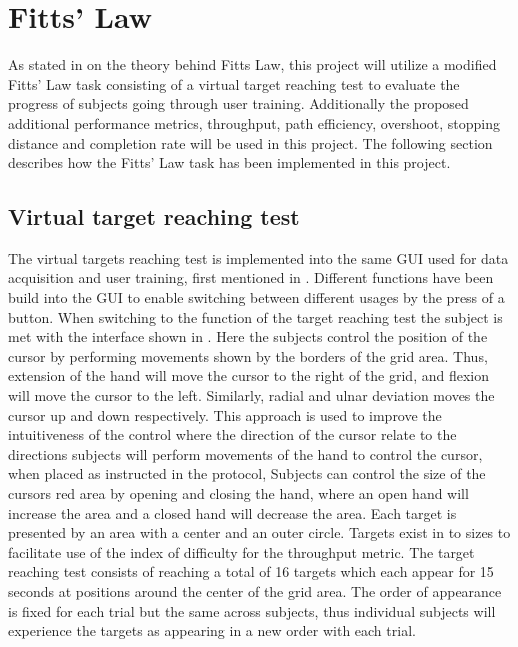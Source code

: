 \section{Fitts' Law} \label{sec:M:fittsLaw}


As stated in  on the theory behind Fitts Law, this project will utilize a modified Fitts' Law task consisting of a virtual target reaching test to evaluate the progress of subjects going through user training. Additionally the proposed additional performance metrics, throughput, path efficiency, overshoot, stopping distance and completion rate will be used in this project. The following section describes how the Fitts' Law task has been implemented in this project.

\subsection{Virtual target reaching test} \label{sub:M:targetReachingTest}

The virtual targets reaching test is implemented into the same GUI used for data acquisition and user training, first mentioned in . Different functions have been build into the GUI to enable switching between different usages by the press of a button. When switching to the function of the target reaching test the subject is met with the interface shown in . Here the subjects control the position of the cursor by performing movements shown by the borders of the grid area. Thus, extension of the hand will move the cursor to the right of the grid, and flexion will move the cursor to the left. Similarly, radial and ulnar deviation moves the cursor up and down respectively. This approach is used to improve the intuitiveness of the control where the direction of the cursor relate to the directions subjects will perform movements of the hand to control the cursor, when placed as instructed in the protocol,  
Subjects can control the size of the cursors red area by opening and closing the hand, where an open hand will increase the area and a closed hand will decrease the area. Each target is presented by an area with a center and an outer circle. Targets exist in to sizes to facilitate use of the index of difficulty for the throughput metric. The target reaching test consists of reaching a total of 16 targets which each appear for 15 seconds at positions around the center of the grid area. The order of appearance is fixed for each trial but the same across subjects, thus individual subjects will experience the targets as appearing in a new order with each trial. 

